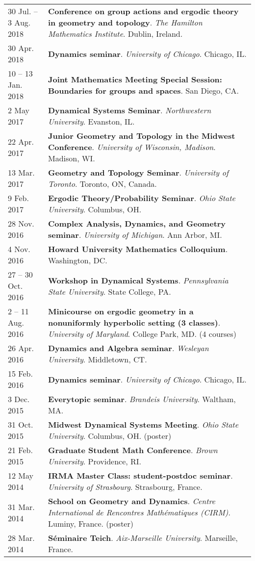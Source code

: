 \begin{center}
{\begin{longtable}{p{}  p{}}
30 Jul.  -- 3 Aug.  2018 & \textbf{Conference on group actions and ergodic theory in geometry and topology}. \textit{The Hamilton Mathematics Institute}.  Dublin, Ireland.  \\ 
30 Apr.  2018 & \textbf{Dynamics seminar}. \textit{University of Chicago}.  Chicago, IL.  \\ 
10  -- 13 Jan.  2018 & \textbf{Joint Mathematics Meeting Special Session: Boundaries for groups and spaces}.  San Diego, CA.  \\ 
2 May  2017 & \textbf{Dynamical Systems Seminar}. \textit{Northwestern University}.  Evanston, IL.  \\ 
22 Apr.  2017 & \textbf{Junior Geometry and Topology in the Midwest Conference}. \textit{University of Wisconsin, Madison}.  Madison, WI.  \\ 
13 Mar.  2017 & \textbf{Geometry and Topology Seminar}. \textit{University of Toronto}.  Toronto, ON, Canada.  \\ 
9 Feb.  2017 & \textbf{Ergodic Theory/Probability Seminar}. \textit{Ohio State University}.  Columbus, OH.  \\ 
28 Nov.  2016 & \textbf{Complex Analysis, Dynamics, and Geometry seminar}. \textit{University of Michigan}.  Ann Arbor, MI.  \\ 
4 Nov.  2016 & \textbf{Howard University Mathematics Colloquium}.  Washington, DC.  \\ 
27  -- 30 Oct.  2016 & \textbf{Workshop in Dynamical Systems}. \textit{Pennsylvania State University}.  State College, PA.  \\ 
2  -- 11 Aug.  2016 & \textbf{Minicourse on ergodic geometry in a nonuniformly hyperbolic setting (3 classes)}. \textit{University of Maryland}.  College Park, MD. (4 courses) \\ 
26 Apr.  2016 & \textbf{Dynamics and Algebra seminar}. \textit{Wesleyan University}.  Middletown, CT.  \\ 
15 Feb.  2016 & \textbf{Dynamics seminar}. \textit{University of Chicago}.  Chicago, IL.  \\ 
3 Dec.  2015 & \textbf{Everytopic seminar}. \textit{Brandeis University}.  Waltham, MA.  \\ 
31 Oct.  2015 & \textbf{Midwest Dynamical Systems Meeting}. \textit{Ohio State University}.  Columbus, OH. (poster) \\ 
21 Feb.  2015 & \textbf{Graduate Student Math Conference}. \textit{Brown University}.  Providence, RI.  \\ 
12 May  2014 & \textbf{IRMA Master Class: student-postdoc seminar}. \textit{University of Strasbourg}.  Strasbourg, France.  \\ 
31 Mar.  2014 & \textbf{School on Geometry and Dynamics}. \textit{Centre International de Rencontres Math\'ematiques (CIRM)}.  Luminy, France. (poster) \\ 
28 Mar.  2014 & \textbf{S\'eminaire Teich}. \textit{Aix-Marseille University}.  Marseille, France.  
    \end{longtable}
    } 
    \end{center}

